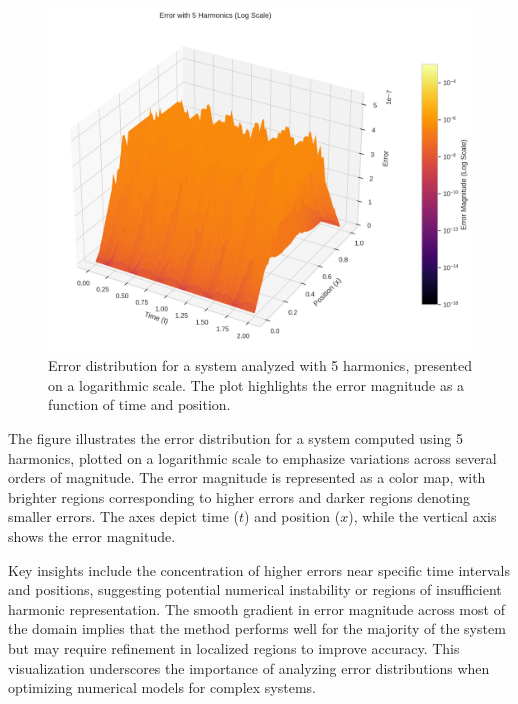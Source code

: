 \documentclass[preprint,12pt]{elsarticle}
\begin{document}
\begin{figure}[t]
    \centering
    \includegraphics[width=1.0\linewidth]{figures/3d_comparison_error_5h.png}
    \caption{Error distribution for a system analyzed with 5 harmonics, presented on a logarithmic scale. The plot highlights the error magnitude as a function of time and position.}
    \label{fig:error_5_harmonics}
\end{figure}


The figure illustrates the error distribution for a system computed using 5 harmonics, plotted on a logarithmic scale to emphasize variations across several orders of magnitude. The error magnitude is represented as a color map, with brighter regions corresponding to higher errors and darker regions denoting smaller errors. The axes depict time (\(t\)) and position (\(x\)), while the vertical axis shows the error magnitude. 

Key insights include the concentration of higher errors near specific time intervals and positions, suggesting potential numerical instability or regions of insufficient harmonic representation. The smooth gradient in error magnitude across most of the domain implies that the method performs well for the majority of the system but may require refinement in localized regions to improve accuracy. This visualization underscores the importance of analyzing error distributions when optimizing numerical models for complex systems.
\end{document}
